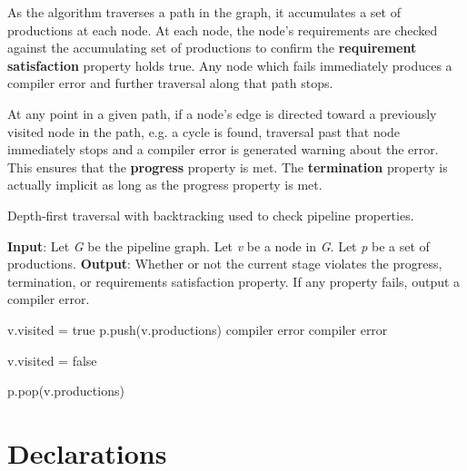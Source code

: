 As the algorithm traverses a path in the graph, it accumulates a set of productions at each node. At each node, the node's requirements are checked against the accumulating set of productions to confirm the \textbf{requirement satisfaction} property holds true. Any node which fails immediately produces a compiler error and further traversal along that path stops.

At any point in a given path, if a node's edge is directed toward a previously visited node in the path, e.g. a cycle is found, traversal past that node immediately stops and a compiler error is generated warning about the error. This ensures that the \textbf{progress} property is met. The \textbf{termination} property is actually implicit as long as the progress property is met. 

\begin{algorithm}
 \caption{Depth-first traversal with backtracking used to check pipeline properties.}
 \label{alg:dfs}
 \begin{algorithmic}
 \State
 \State \textbf{Input}: Let \textit{G} be the pipeline graph. Let \textit{v} be a node in \textit{G}. Let \textit{p} be a set of productions.
 \State \textbf{Output}: Whether or not the current stage violates the progress, termination, or requirements satisfaction property. If any property fails, output a compiler error.
 \State 
 
 	\State v.visited = true
 	\State p.push(v.productions)
 				\State {}
 			\Else
 				\State \Return compiler error
 			\EndIf
 		\EndFor
	\Else 	
 		\State \Return compiler error
 	\EndIf
 	
 	\State v.visited = false 
 	
 	\State p.pop(v.productions) 
 \EndFunction
 \end{algorithmic}
 
\end{algorithm}

\section{Declarations} \label{declaration_guide}

